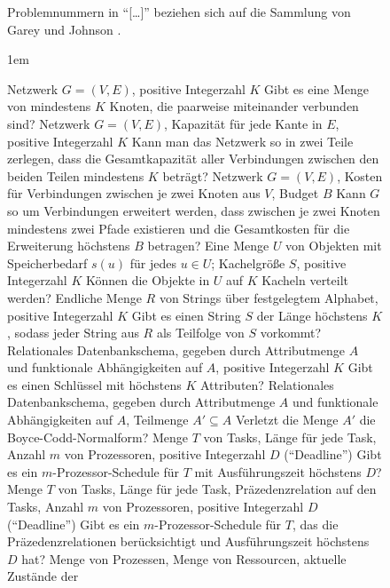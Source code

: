 \begin{figure}
\begin{center}
\footnotesize
Problemnummern in "`[\dots]"' beziehen sich auf die Sammlung von
Garey und Johnson \cite{GaJo79}.

\columnsep1em
\begin{multicols}{2}
{Netzwerk $G=(V,E)$, positive Integerzahl $K$}
{Gibt es eine Menge von mindestens $K$ Knoten, die paarweise miteinander
verbunden sind?}
%
{Netzwerk $G=(V,E)$, Kapazität für jede Kante in $E$, positive
Integerzahl $K$}
{Kann man das Netzwerk so in zwei Teile zerlegen, dass die Gesamtkapazität
aller Verbindungen zwischen den beiden Teilen mindestens $K$ beträgt?}
%
{Netzwerk $G=(V,E)$, Kosten für Verbindungen zwischen je zwei Knoten aus 
$V$, Budget $B$}
{Kann $G$ so um Verbindungen erweitert werden, dass zwischen je zwei Knoten
mindestens zwei Pfade existieren und die Gesamtkosten für die Erweiterung
höchstens $B$ betragen?}
%
{Eine Menge $U$ von Objekten mit Speicherbedarf $s(u)$ für jedes $u \in U$;
Kachelgröße $S$, positive Integerzahl $K$}
{Können die Objekte in $U$ auf $K$ Kacheln verteilt werden?}
%
{Endliche Menge $R$ von Strings über festgelegtem Alphabet, positive
Integerzahl $K$}
{Gibt es einen String $S$ der Länge höchstens $K$, sodass jeder String aus $R$
als Teilfolge von $S$ vorkommt?}
%
{Relationales Datenbankschema, gegeben durch Attributmenge $A$ und
funktionale Abhängigkeiten auf $A$, positive Integerzahl $K$}
{Gibt es einen Schlüssel mit höchstens $K$ Attributen?}
%
\goodbreak
%
{Relationales Datenbankschema, gegeben durch Attributmenge $A$ und
funktionale Abhängigkeiten auf $A$, Teilmenge $A' \subseteq A$}
{Verletzt die Menge $A'$ die Boyce-Codd-Normalform?}
%
{Menge $T$ von Tasks, Länge für jede Task, Anzahl $m$ von Prozessoren, 
positive Integerzahl $D$ ("`Deadline"')}
{Gibt es ein $m$-Prozessor-Schedule für $T$ mit Ausführungszeit höchstens
$D$?}
%
{Menge $T$ von Tasks, Länge für jede Task, Präzedenzrelation auf den
Tasks, Anzahl $m$ von Prozessoren, positive Integerzahl $D$
("`Deadline"')}
{Gibt es ein $m$-Prozessor-Schedule für $T$, das die
Präzedenzrelationen berücksichtigt und Ausführungszeit höchstens $D$
hat?}
%
{Menge von Prozessen, Menge von Ressourcen, aktuelle Zustände der 
}
\end{multicols}
\end{center}
\end{figure}
